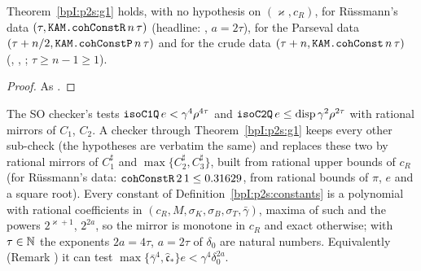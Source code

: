 \begin{corollary}[Instances]\label{bpI:p2s:g1-instances}
Theorem~\ref{bpI:p2s:g1} holds, with no hypothesis on $(\varkappa,c_R)$, for R\"ussmann's data $(\tau,\texttt{KAM.cohConstR}\,n\,\tau)$ (headline:
, $a=2\tau$), for the Parseval data $(\tau+n/2,\texttt{KAM.cohConstP}\,n\,\tau)$ and for the crude data
$(\tau+n,\texttt{KAM.cohConst}\,n\,\tau)$ (, , ; $\tau\ge n-1\ge1$).
\end{corollary}

\begin{proof}
\label{stepI:p2s:inst}
As .
\end{proof}

\begin{remark}\label{bpI:p2s:certificate}
The SO checker's  tests $\texttt{isoC1Q}\,e<\gamma^4\rho^{4\tau}$ and $\texttt{isoC2Q}\,e\le\mathrm{disp}\,\gamma^2\rho^{2\tau}$ with rational
mirrors of $C_1$, $C_2$. A checker through Theorem~\ref{bpI:p2s:g1} keeps every other sub-check (the hypotheses are verbatim the same) and
replaces these two by rational mirrors of $C_1^\sharp$ and $\max\{C_2^\sharp,C_3^\sharp\}$, built from rational upper bounds of $c_R$ (for R\"ussmann's
data: $\texttt{cohConstR}\,2\,1\le0.31629$, from rational bounds of $\pi$, $e$ and a square root). Every constant of
Definition~\ref{bpI:p2s:constants} is a polynomial with rational coefficients in $(c_R,M,\sigma_K,\sigma_B,\sigma_T,\bar\gamma)$, maxima of such and the powers
$2^{\varkappa+1}$, $2^{2a}$, so the mirror is monotone in $c_R$ and exact otherwise; with $\tau\in\mathbb{N}$ the exponents $2a=4\tau$, $a=2\tau$ of $\delta_0$ are
natural numbers. Equivalently (Remark ) it can test $\max\{\bar\gamma^4,\hat{\mathfrak c}_*\}e<\gamma^4\delta_0^{2a}$.
\end{remark}

